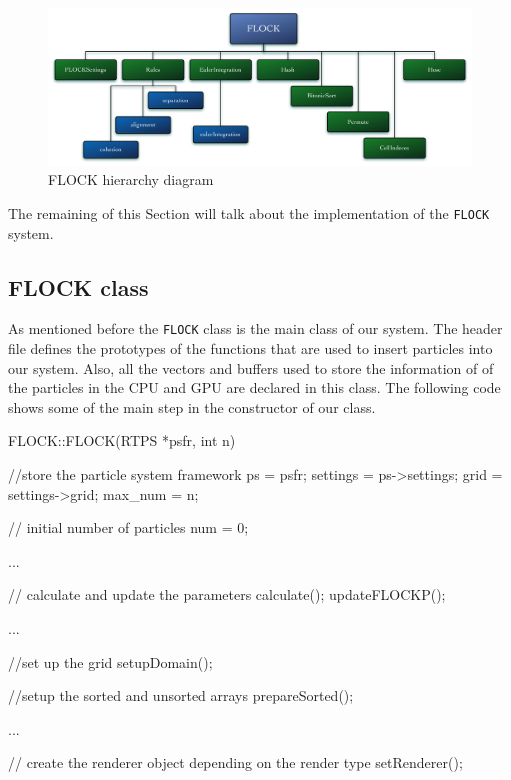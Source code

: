 \begin{figure}[htbp]
\begin{center}
\includegraphics[scale=0.3]{figures/FLOCKdiagram.pdf}
\caption{FLOCK hierarchy diagram}
\label{flockdiagram}
\end{center}
\end{figure}


The remaining of this Section will talk about the implementation of the \texttt{FLOCK} system.

\subsection{FLOCK class}
As mentioned before the \texttt{FLOCK} class is the main class of our system. The header file defines the prototypes of the functions that are used to insert particles into our system. Also, all the vectors and buffers used to store the information of of the particles in the CPU and GPU are declared in this class. The following code shows some of the main step in the constructor of our class.

\begin{cppcode}{0}
FLOCK::FLOCK(RTPS *psfr, int n)
 {
 	//store the particle system framework
 	ps = psfr;
	settings = ps->settings;
	grid = settings->grid;
	max_num = n;
	
	// initial number of particles
	num = 0;
 	
	...
 
 	// calculate and update the parameters
	calculate();
	updateFLOCKP();

	...

	//set up the grid
	setupDomain();
	
	//setup the sorted and unsorted arrays
	prepareSorted();
 	 
	 ...
		
	// create the renderer object depending on the render type		
	setRenderer(); 
}
\end{cppcode}

